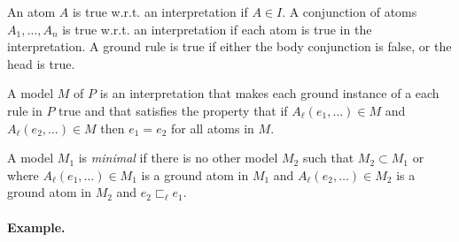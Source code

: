 \documentclass[10pt,twocolumn]{article}
\begin{document}
An atom $A$ is true w.r.t. an interpretation if $A \in I$. 
A conjunction of atoms $A_1, \dots, A_n$ is true w.r.t. an interpretation if each atom is true in the interpretation.
A ground rule is true if either the body conjunction is false, or the head is true.

A model $M$ of $P$ is an interpretation that makes each ground instance of a each rule in $P$ true and that satisfies the property that if $A_\ell(e_1, \dots) \in M$ and $A_\ell(e_2, \dots) \in M$ then $e_1 = e_2$ for all atoms in $M$.

A model $M_1$ is \emph{minimal} if there is no other model $M_2$ such 
that $M_2 \subset M_1$ or where $A_\ell(e_1, \dots) \in M_1$ is a ground atom in $M_1$ 
and $A_\ell(e_2, \dots) \in M_2$ is a ground atom in $M_2$ and $e_2 \sqsubset_\ell e_1$.




\paragraph{Example.}
\end{document}
